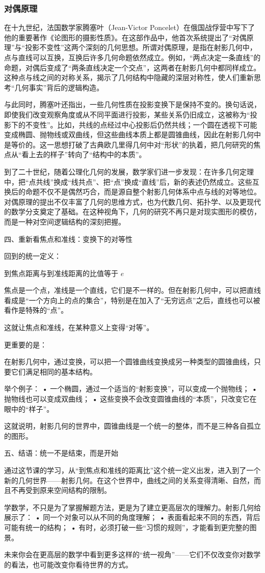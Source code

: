 \subsubsection{对偶原理}

在十九世纪，法国数学家腾塞叶（Jean-Victor Poncelet）在俄国战俘营中写下了他的重要著作《论图形的摄影性质》。在这部作品中，他首次系统提出了“对偶原理”与“投影不变性”这两个深刻的几何思想。所谓对偶原理，是指在射影几何中，点与直线可以互换，互换后许多几何命题依然成立。例如，“两点决定一条直线”的命题，对偶后变成了“两条直线决定一个交点”，这两者在射影几何中都同样成立。这种点与线之间的对称关系，揭示了几何结构中隐藏的深层对称性，使人们重新思考“几何事实”背后的逻辑构造。

与此同时，腾塞叶还指出，一些几何性质在投影变换下是保持不变的。换句话说，即使我们改变观察角度或从不同平面进行投影，某些关系仍旧成立，这被称为“投影下的不变性”。比如，共线的点经过中心投影后仍然共线；一个圆在透视下可能变成椭圆、抛物线或双曲线，但这些曲线本质上都是圆锥曲线，因此在射影几何中是等价的。这一思想打破了古典欧几里得几何中对“形状”的执着，把几何研究的焦点从“看上去的样子”转向了“结构中的本质”。

到了二十世纪，随着公理化几何的发展，数学家们进一步发现：在许多几何定理中，把“点共线”换成“线共点”、把“点”换成“直线”后，新的表述仍然成立。这些互换后的命题不仅不是偶然巧合，而是源自整个射影几何体系中点与线的对等地位。对偶原理的提出不仅丰富了几何的思维方式，也为代数几何、拓扑学、以及更现代的数学分支奠定了基础。在这种视角下，几何的研究不再只是对现实图形的模仿，而是一种对空间逻辑结构的深刻把握。


四、重新看焦点和准线：变换下的对等性

回到的统一定义：

到焦点距离与到准线距离的比值等于 $e$

焦点是一个点，准线是一个直线，它们是不一样的。但在射影几何中，可以把直线看成是“一个方向上的点的集合”，特别是在加入了“无穷远点”之后，直线也可以被看作是特殊的“点”。

这就让焦点和准线，在某种意义上变得“对等”。

更重要的是：

在射影几何中，通过变换，可以把一个圆锥曲线变换成另一种类型的圆锥曲线，只要它们满足相同的基本结构。

举个例子：
	•	一个椭圆，通过一个适当的“射影变换”，可以变成一个抛物线；
	•	抛物线也可以变成双曲线；
	•	这些变换不会改变圆锥曲线的“本质”，只改变它在眼中的“样子”。

这就说明，射影几何的世界中，圆锥曲线是一个统一的整体，而不是三种各自孤立的图形。

五、结语：统一不是结束，而是开始

通过这节课的学习，从“到焦点和准线的距离比”这个统一定义出发，进入到了一个新的几何世界——射影几何。在这个世界中，曲线之间的关系变得清晰、自然，而且不再受到原来空间结构的限制。

学数学，不只是为了掌握解题方法，更是为了建立更高层次的理解力。射影几何给展示了：
	•	同一个对象可以从不同的角度理解；
	•	表面看起来不同的东西，背后可能有统一的结构；
	•	有时，必须打破一些“习惯的规则”，才能看到更完整的图景。

未来你会在更高层的数学中看到更多这样的“统一视角”——它们不仅改变你对数学的看法，也可能改变你看待世界的方式。
